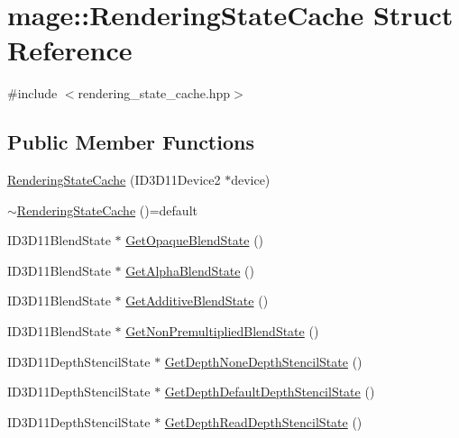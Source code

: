 \hypertarget{structmage_1_1_rendering_state_cache}{}\section{mage\+:\+:Rendering\+State\+Cache Struct Reference}
\label{structmage_1_1_rendering_state_cache}


{\ttfamily \#include $<$rendering\+\_\+state\+\_\+cache.\+hpp$>$}

\subsection*{Public Member Functions}
\begin{DoxyCompactItemize}
\item 
\hyperlink{structmage_1_1_rendering_state_cache_ad818eaa6c950c5851d6e684b9a4b3a65}{Rendering\+State\+Cache} (I\+D3\+D11\+Device2 $\ast$device)
\item 
\hyperlink{structmage_1_1_rendering_state_cache_a11b1c323310168153a60f5afef7def8d}{$\sim$\+Rendering\+State\+Cache} ()=default
\item 
I\+D3\+D11\+Blend\+State $\ast$ \hyperlink{structmage_1_1_rendering_state_cache_a7208ccd74aa075e5283ad91d0efdf455}{Get\+Opaque\+Blend\+State} ()
\item 
I\+D3\+D11\+Blend\+State $\ast$ \hyperlink{structmage_1_1_rendering_state_cache_a19ad72ad35096722e3d61e58e0ab9205}{Get\+Alpha\+Blend\+State} ()
\item 
I\+D3\+D11\+Blend\+State $\ast$ \hyperlink{structmage_1_1_rendering_state_cache_afa897dcd0b71e4ff8e6ce6d8e31aaa71}{Get\+Additive\+Blend\+State} ()
\item 
I\+D3\+D11\+Blend\+State $\ast$ \hyperlink{structmage_1_1_rendering_state_cache_ae1b3d9745e1761e45908d9ad7c4f29dd}{Get\+Non\+Premultiplied\+Blend\+State} ()
\item 
I\+D3\+D11\+Depth\+Stencil\+State $\ast$ \hyperlink{structmage_1_1_rendering_state_cache_a5885a7c2a375bcb37d2139e04e162ecd}{Get\+Depth\+None\+Depth\+Stencil\+State} ()
\item 
I\+D3\+D11\+Depth\+Stencil\+State $\ast$ \hyperlink{structmage_1_1_rendering_state_cache_aaa928ab554db5e83354bca7f7d82308d}{Get\+Depth\+Default\+Depth\+Stencil\+State} ()
\item 
I\+D3\+D11\+Depth\+Stencil\+State $\ast$ \hyperlink{structmage_1_1_rendering_state_cache_adca5a3b2a24505f4c8bcad07ff1d3d42}{Get\+Depth\+Read\+Depth\+Stencil\+State} ()

\end{DoxyCompactItemize}
